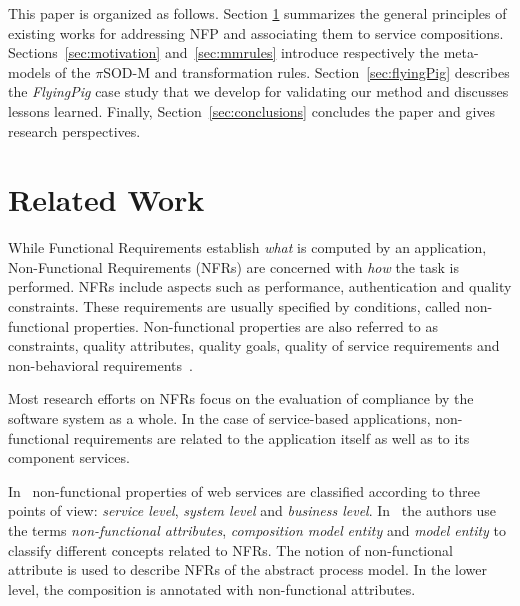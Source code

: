 \documentclass[12pt,twoside]{article}
\theoremstyle{plain}
\theoremstyle{plain}
\newcommand{\pisodm}[0]{$\pi$SOD-M\xspace}
\def\FlyingPig{\textsl{FlyingPig}\xspace}
\begin{document}
\begin{multicols}{2}
\bigskip
This paper is organized as follows.
Sec\-tion \ref{sec:relworks} summarizes the general principles of existing works for addressing NFP and associating them to service compositions.
Sections~\ref{sec:motivation} and~\ref{sec:mmrules} introduce respectively the meta-models of the \pisodm and transformation rules.
Section~\ref{sec:flyingPig} describes the \FlyingPig case study that we develop for validating our method and discusses lessons learned.
Finally, Section~\ref{sec:conclusions} concludes the paper and gives research perspectives.







\section{Related Work}
\label{sec:relworks}
While Functional Requirements establish \textit{what} is computed by an application, Non-Functional Requirements (NFRs) are concerned with \textit{how} the task is performed.
NFRs include aspects such as performance, authentication and quality constraints.
These requirements are usually specified by conditions, called non-functional properties.
Non-functional properties are also referred to as constraints, quality attributes, quality goals, quality of service requirements and non-behavioral requirements~\cite{Chung91,MylopoulosBook99,Chung2009}.

Most research  efforts on NFRs focus on the evaluation of compliance by the software system as a whole. %
In the case of service-based applications, non-functional requirements are related to the application itself as well as to its component services.

In~\cite{Babamir2010,Yeom2006} non-functional properties of web services are classified according to three points of view:
\textit{service level}, \textit{system level} and \textit{business level}.
In~\cite{XiaoCZBOLH08} the authors use the terms
\textit{non-functional attributes}, \textit{composition mo\-del}  \textit{entity} and \textit{mo\-del entity}  to classify different concepts related to NFRs.
The notion of non-functional attribute is used to describe NFRs of the abstract process model.
In the lower level, the composition is annotated with non-functional attributes.


\end{multicols}
\end{document}
